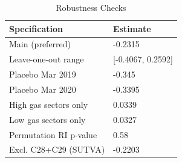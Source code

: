 \begin{table}[!h]
\centering
\caption{\label{tab:tab:robustness}Robustness Checks}
\centering
\begin{tabular}[t]{ll}
\toprule
Specification & Estimate\\
\midrule
Main (preferred) & -0.2315\\
Leave-one-out range & {}[-0.4067, 0.2592]\\
Placebo Mar 2019 & -0.345\\
Placebo Mar 2020 & -0.3395\\
High gas sectors only & 0.0339\\
\addlinespace
Low gas sectors only & 0.0327\\
Permutation RI p-value & 0.58\\
Excl. C28+C29 (SUTVA) & -0.2203\\
\bottomrule
\end{tabular}
\end{table}

